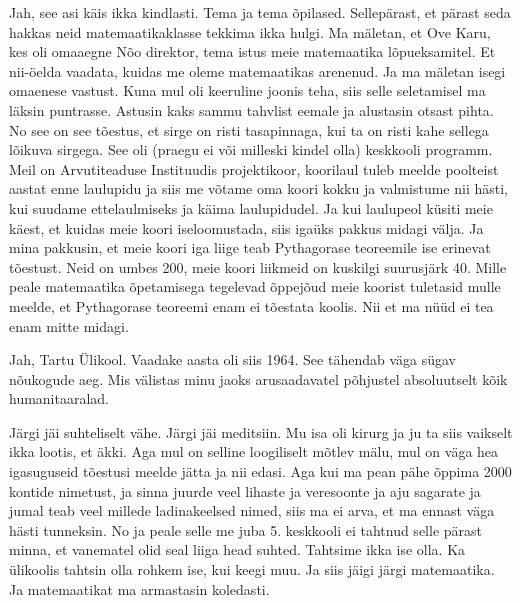 
Jah, see asi käis ikka kindlasti. Tema ja tema õpilased. Sellepärast, et pärast seda hakkas neid matemaatikaklasse tekkima ikka hulgi. Ma mäletan, et Ove Karu, kes oli omaaegne Nõo direktor, tema istus meie matemaatika lõpueksamitel. Et nii-öelda vaadata, kuidas me oleme matemaatikas arenenud. Ja ma mäletan isegi omaenese vastust. Kuna mul oli keeruline joonis teha, siis selle seletamisel ma läksin puntrasse. Astusin kaks sammu tahvlist eemale ja alustasin otsast pihta. No see on see tõestus, et sirge on risti tasapinnaga, kui ta on risti kahe sellega lõikuva sirgega. See oli (praegu ei või milleski kindel olla) keskkooli programm. Meil on Arvutiteaduse Instituudis projektikoor, koorilaul tuleb meelde poolteist aastat enne laulupidu ja siis me võtame oma koori kokku ja valmistume nii hästi, kui suudame  ettelaulmiseks ja käima laulupidudel. Ja kui laulupeol küsiti meie käest, et kuidas meie koori iseloomustada, siis igaüks pakkus midagi välja. Ja mina pakkusin, et meie koori iga liige teab Pythagorase teoreemile ise erinevat tõestust. Neid on umbes 200, meie koori liikmeid on kuskilgi suurusjärk 40. Mille peale matemaatika õpetamisega tegelevad õppejõud meie koorist tuletasid mulle meelde, et Pythagorase teoreemi enam ei tõestata koolis. Nii et ma nüüd ei tea enam mitte midagi.


Jah, Tartu Ülikool. Vaadake aasta oli siis 1964. See tähendab väga sügav nõukogude aeg. Mis välistas minu jaoks arusaadavatel põhjustel absoluutselt kõik humanitaaralad. 

Järgi jäi suhteliselt vähe. Järgi jäi meditsiin. Mu isa oli kirurg ja ju ta siis vaikselt ikka lootis, et äkki. Aga mul on selline loogiliselt mõtlev mälu, mul on väga hea igasuguseid tõestusi meelde jätta ja nii edasi. Aga kui ma pean pähe õppima 2000 kontide nimetust, ja sinna juurde veel lihaste ja veresoonte ja aju sagarate ja jumal teab veel millede ladinakeelsed nimed, siis ma ei arva, et ma ennast väga hästi tunneksin. No ja peale selle me juba 5. keskkooli ei tahtnud selle pärast minna, et vanematel olid seal liiga head suhted. Tahtsime ikka ise olla. Ka  ülikoolis tahtsin olla rohkem ise, kui keegi muu. Ja siis jäigi järgi matemaatika. Ja matemaatikat ma armastasin koledasti. 

